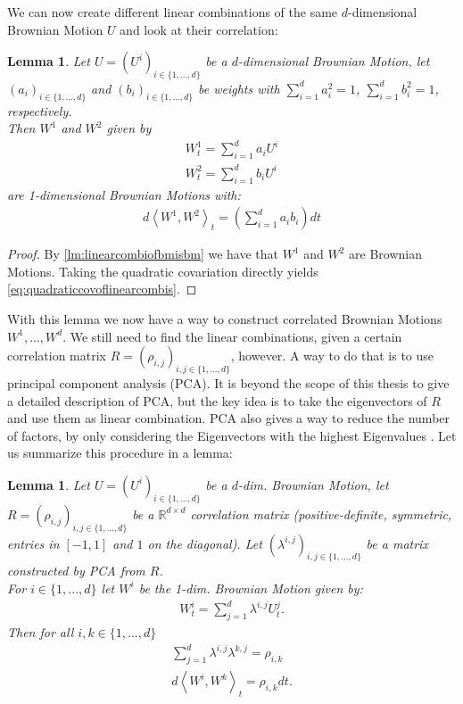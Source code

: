 \documentclass[12pt]{article}
\newtheorem{lemma}[theorem]{Lemma}
\begin{document}
	We can now create different linear combinations of the same $d$-dimensional Brownian Motion $U$ and look at their correlation:
	\begin{lemma}
		Let $U = (U^i)_{i\in\{1, ..., d\}}$ be a $d$-dimensional Brownian Motion, let $(a_i)_{i\in\{1,..., d\}}$ and $(b_i)_{i\in\{1,..., d\}}$ be weights with $\sum_{i=1}^{d}a^2_i = 1$, $\sum_{i=1}^{d}b^2_i = 1$, respectively.\\
		Then $W^1$ and $W^2$ given by 
		\begin{align*}
			W^1_t = \sum_{i=1}^{d}a_iU^i\\
			W^2_t = \sum_{i=1}^{d}b_iU^i
		\end{align*}
		are 1-dimensional Brownian Motions with:
		\begin{align}\label{eq:quadraticcovoflinearcombis}
			d\left\langle W^{1}, W^{2} \right\rangle_t = \left(\sum_{i=1}^{d}a_ib_i \right)dt
		\end{align}
	\end{lemma}
	\begin{proof}
		By \cref{lm:linearcombiofbmisbm} we have that $W^1$ and $W^2$ are Brownian Motions. Taking the quadratic covariation directly yields \cref{eq:quadraticcovoflinearcombis}.
	\end{proof}
	With this lemma we now have a way to construct correlated Brownian Motions $W^1, ..., W^d$. We still need to find the linear combinations, given a certain correlation matrix $R = (\rho_{i,j})_{i,j\in\{1,...,d\}}$, however. A way to do that is to use principal component analysis (PCA). It is beyond the scope of this thesis to give a detailed description of PCA, but the key idea is to take the eigenvectors of $R$ and use them as linear combination. PCA also gives a way to reduce the number of factors, by only considering the Eigenvectors with the highest Eigenvalues \cite{FriesBook}. Let us summarize this procedure in a lemma:
	\begin{lemma}
		Let $U=(U^i)_{i\in\{1, ..., d\}}$ be a $d$-dim. Brownian Motion, let $R=(\rho_{i,j})_{i,j\in\{1,...,d\}}$ be a $\mathbb{R}^{d\times d}$ correlation matrix (positive-definite, symmetric, entries in $\left[-1,1\right]$ and $1$ on the diagonal). Let $(\lambda^{i,j})_{i,j\in\{1,...,d\}}$ be a matrix constructed by PCA from $R$.\\
		For $i\in \{1,...,d\}$ let $W^i$ be the 1-dim. Brownian Motion given by:
		\begin{align*}
			W^i_t = \sum_{j=1}^{d}\lambda^{i,j}U^j_t.
		\end{align*}
		Then for all $i, k \in \{1, ..., d\}$ 
		\begin{align*}
			\sum_{j=1}^{d}\lambda^{i,j}\lambda^{k,j} = \rho_{i,k}\\
			d\left\langle W^{i}, W^{k} \right\rangle_t = \rho_{i,k}dt.
		\end{align*}
	\end{lemma}
\end{document}

